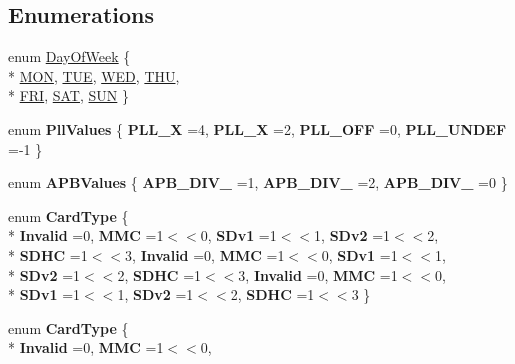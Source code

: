 \subsection*{Enumerations}
\begin{DoxyCompactItemize}
\item 
enum \hyperlink{group___hardware_ga24027ab4dbf8557211c0a82fb0dffcbf}{Day\-Of\-Week} \{ \\*
\hyperlink{group___hardware_gga24027ab4dbf8557211c0a82fb0dffcbfa962bfb6be11410d30c4406070a19c258}{M\-O\-N}, 
\hyperlink{group___hardware_gga24027ab4dbf8557211c0a82fb0dffcbfac3cdcd22d875a6100df4d9b731017962}{T\-U\-E}, 
\hyperlink{group___hardware_gga24027ab4dbf8557211c0a82fb0dffcbfab74451ba70e3887ee80b2a610e7ba4a6}{W\-E\-D}, 
\hyperlink{group___hardware_gga24027ab4dbf8557211c0a82fb0dffcbfac781efe7eb3004ee537bc9775649873b}{T\-H\-U}, 
\\*
\hyperlink{group___hardware_gga24027ab4dbf8557211c0a82fb0dffcbfabd3c27af7a56a1b8c819ed28e62df294}{F\-R\-I}, 
\hyperlink{group___hardware_gga24027ab4dbf8557211c0a82fb0dffcbfa79c766ae1d0b17f35209890dd935874c}{S\-A\-T}, 
\hyperlink{group___hardware_gga24027ab4dbf8557211c0a82fb0dffcbfad5b4e6dd4a05ccf70b7f72c8716c0208}{S\-U\-N}
 \}
\item 
enum {\bfseries Pll\-Values} \{ {\bfseries P\-L\-L\-\_\-X} =4, 
{\bfseries P\-L\-L\-\_\-X} =2, 
{\bfseries P\-L\-L\-\_\-\-O\-F\-F} =0, 
{\bfseries P\-L\-L\-\_\-\-U\-N\-D\-E\-F} =-\/1
 \}
\item 
enum {\bfseries A\-P\-B\-Values} \{ {\bfseries A\-P\-B\-\_\-\-D\-I\-V\-\_} =1, 
{\bfseries A\-P\-B\-\_\-\-D\-I\-V\-\_} =2, 
{\bfseries A\-P\-B\-\_\-\-D\-I\-V\-\_} =0
 \}
\item 
enum {\bfseries Card\-Type} \{ \\*
{\bfseries Invalid} =0, 
{\bfseries M\-M\-C} =1$<$$<$0, 
{\bfseries S\-Dv1} =1$<$$<$1, 
{\bfseries S\-Dv2} =1$<$$<$2, 
\\*
{\bfseries S\-D\-H\-C} =1$<$$<$3, 
{\bfseries Invalid} =0, 
{\bfseries M\-M\-C} =1$<$$<$0, 
{\bfseries S\-Dv1} =1$<$$<$1, 
\\*
{\bfseries S\-Dv2} =1$<$$<$2, 
{\bfseries S\-D\-H\-C} =1$<$$<$3, 
{\bfseries Invalid} =0, 
{\bfseries M\-M\-C} =1$<$$<$0, 
\\*
{\bfseries S\-Dv1} =1$<$$<$1, 
{\bfseries S\-Dv2} =1$<$$<$2, 
{\bfseries S\-D\-H\-C} =1$<$$<$3
 \}
\item 
enum {\bfseries Card\-Type} \{ \\*
{\bfseries Invalid} =0, 
{\bfseries M\-M\-C} =1$<$$<$0, 
$$
\end{DoxyCompactItemize}
